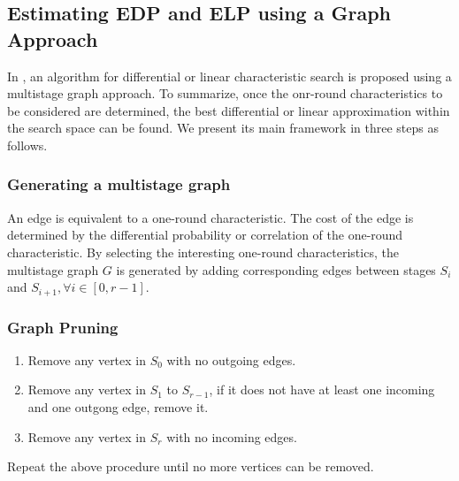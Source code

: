 \subsection{Estimating EDP and ELP using a Graph Approach}\label{sec:frame-msg}

In \cite{EPRINT:HalVej18}, an algorithm for differential or linear characteristic search is proposed using a multistage graph approach. To summarize, once the onr-round characteristics to be considered are determined, the best differential or linear approximation within the search space can be found. We present its main framework in three steps as follows.

\subsubsection{Generating a multistage graph}
An edge is equivalent to a one-round characteristic. The cost of the edge is determined by the differential probability or correlation of the one-round characteristic. By selecting the interesting one-round characteristics, the multistage graph $G$ is generated by adding corresponding edges between stages $S_i$ and $S_{i+1}, \forall i\in[0,r-1]$. 

\subsubsection{Graph Pruning}
\begin{enumerate}
    \item Remove any vertex in $S_0$ with no outgoing edges.
    \item Remove any vertex in $S_1$ to $S_{r-1}$, if it does not have at least one incoming and one outgong edge, remove it.
    \item Remove any vertex in $S_r$ with no incoming edges.
\end{enumerate}
Repeat the above procedure until no more vertices can be removed. 

